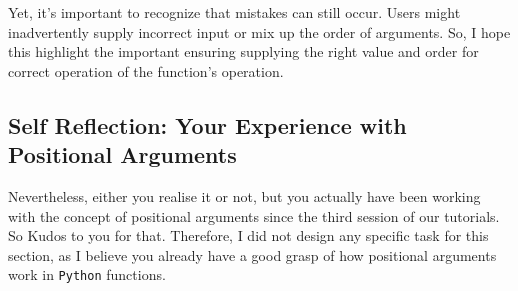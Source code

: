 Yet, it's important to recognize that mistakes can still occur. Users might inadvertently supply incorrect input or mix up the order of arguments. So, I hope this highlight the important ensuring supplying the right value and order for correct operation of the function's operation.

\subsection{Self Reflection: Your Experience with Positional Arguments}
Nevertheless, either you realise it or not, but you actually have been working with the concept of positional arguments since the third session of our tutorials. So Kudos to you for that. Therefore, I did not design any specific task for this section, as I believe you already have a good grasp of how positional arguments work in \texttt{Python} functions.
